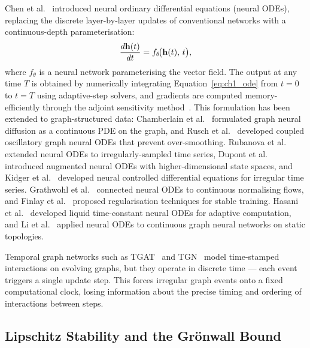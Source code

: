 Chen et al.~\cite{Chen2018} introduced neural ordinary differential equations (neural ODEs), replacing the discrete layer-by-layer updates of conventional networks with a continuous-depth parameterisation:
\begin{equation}
\frac{d\mathbf{h}(t)}{dt} = f_\theta\!\bigl(\mathbf{h}(t),\, t\bigr),
\label{eq:ch1_ode}
\end{equation}
where $f_\theta$ is a neural network parameterising the vector field. The output at any time $T$ is obtained by numerically integrating Equation~\eqref{eq:ch1_ode} from $t=0$ to $t=T$ using adaptive-step solvers, and gradients are computed memory-efficiently through the adjoint sensitivity method~\cite{Pontryagin1962}. This formulation has been extended to graph-structured data: Chamberlain et al.~\cite{Chamberlain2021} formulated graph neural diffusion as a continuous PDE on the graph, and Rusch et al.~\cite{Rusch2022} developed coupled oscillatory graph neural ODEs that prevent over-smoothing. Rubanova et al.~\cite{Rubanova2019} extended neural ODEs to irregularly-sampled time series, Dupont et al.~\cite{Dupont2019} introduced augmented neural ODEs with higher-dimensional state spaces, and Kidger et al.~\cite{Kidger2020} developed neural controlled differential equations for irregular time series. Grathwohl et al.~\cite{Grathwohl2019} connected neural ODEs to continuous normalising flows, and Finlay et al.~\cite{Finlay2020} proposed regularisation techniques for stable training. Hasani et al.~\cite{Hasani2021} developed liquid time-constant neural ODEs for adaptive computation, and Li et al.~\cite{Li2020ode} applied neural ODEs to continuous graph neural networks on static topologies.

Temporal graph networks such as TGAT~\cite{Xu2020tgat} and TGN~\cite{Rossi2020} model time-stamped interactions on evolving graphs, but they operate in discrete time --- each event triggers a single update step. This forces irregular graph events onto a fixed computational clock, losing information about the precise timing and ordering of interactions between steps.


\subsection{Lipschitz Stability and the Gr\"{o}nwall Bound}

